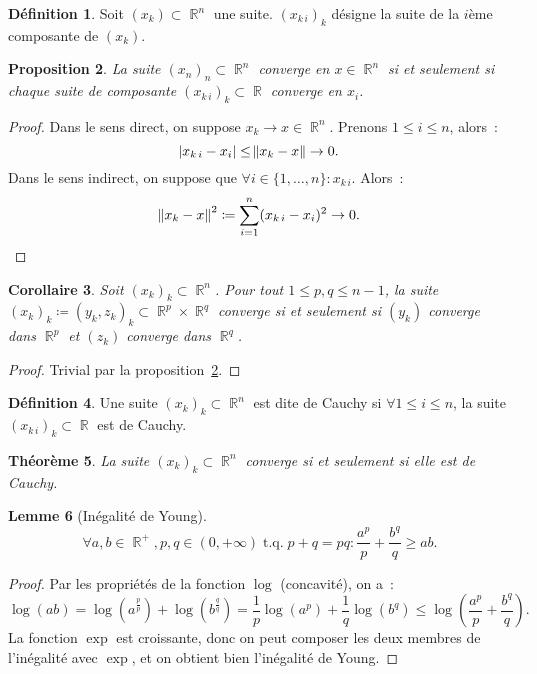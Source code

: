 \documentclass{article}
\DeclareMathOperator{\R}{\mathbb R}
\DeclareMathOperator{\tq}{ t.q. }
\newtheorem{thm}{Théorème}[section]
\newtheorem{prp}[thm]{Proposition}
\newtheorem{cor}[thm]{Corollaire}
\newtheorem{lem}[thm]{Lemme}
\theoremstyle{definition}
\newtheorem{déf}[thm]{Définition}
\theoremstyle{remark}
\begin{document}
		\begin{déf} Soit $(x_k) \subset \R^n$ une suite. $(x_{k\,i})_k$ désigne la suite de la $i$ème composante de $(x_k)$. \end{déf}

		\begin{prp}\label{convergenceRnComposantes} La suite $(x_n)_n \subset \R^n$ converge en $x \in \R^n$ si et seulement si chaque suite de composante
		$(x_{k\,i})_k \subset \R$ converge en $x_i$. \end{prp}

		\begin{proof} Dans le sens direct, on suppose $x_k \to x \in \R^n$. Prenons $1 \leq i \leq n$, alors~:
		\[\abs {x_{k\,i} - x_i} \leq \norm {x_k - x} \to 0.\]
		Dans le sens indirect, on suppose que $\forall i \in \{1, \dotsc, n\} : x_{k\,i}$. Alors~:
		\[\norm {x_k - x}^2 \coloneqq \sum_{i=1}^n(x_{k\,i} - x_i)^2 \to 0.\]
		\end{proof}

		\begin{cor} Soit $(x_k)_k \subset \R^n$. Pour tout $1 \leq p, q \leq n-1$, la suite $(x_k)_k \coloneqq (y_k, z_k)_k \subset \R^p \times \R^q$
		converge si et seulement si $(y_k)$ converge dans $\R^p$ et $(z_k)$ converge dans $\R^q$. \end{cor}

		\begin{proof} Trivial par la proposition~\ref{convergenceRnComposantes}. \end{proof}

		\begin{déf} Une suite $(x_k)_k \subset \R^n$ est dite de Cauchy si $\forall 1 \leq i \leq n$, la suite $(x_{k\,i})_k \subset \R$ est de Cauchy. \end{déf}

		\begin{thm} La suite $(x_k)_k \subset \R^n$ converge si et seulement si elle est de Cauchy. \end{thm}

		\begin{lem}[Inégalité de Young] \[\forall a, b \in \R^+, p, q \in (0, +\infty) \tq p+q=pq : \frac {a^p}p + \frac {b^q}q \geq ab.\] \end{lem}

		\begin{proof} Par les propriétés de la fonction $\log$ (concavité), on a~:
		\[\log(ab) = \log\left(a^{\frac pp}\right) + \log\left(b^{\frac qq}\right) = \frac 1p\log\left(a^p\right) + \frac 1q\log\left(b^q\right) \leq \log\left(\frac {a^p}p + \frac {b^q}q\right).\]
		La fonction $\exp$ est croissante, donc on peut composer les deux membres de l'inégalité avec $\exp$, et on obtient bien l'inégalité de Young.
		\end{proof}
\end{document}
